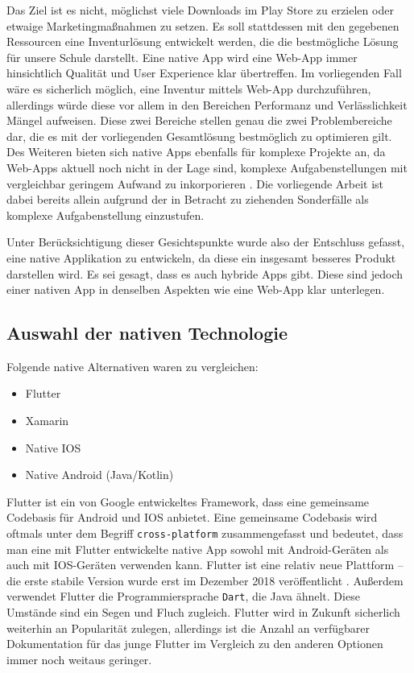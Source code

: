 Das Ziel ist es nicht, möglichst viele Downloads im Play Store zu
erzielen oder etwaige Marketingmaßnahmen zu setzen. Es soll stattdessen
mit den gegebenen Ressourcen eine Inventurlösung entwickelt werden, die
die bestmögliche Lösung für unsere Schule darstellt. Eine native App
wird eine Web-App immer hinsichtlich Qualität und User Experience klar
übertreffen. Im vorliegenden Fall wäre es sicherlich möglich, eine
Inventur mittels Web-App durchzuführen, allerdings würde diese vor allem
in den Bereichen Performanz und Verlässlichkeit Mängel aufweisen. Diese
zwei Bereiche stellen genau die zwei Problembereiche dar, die es mit der
vorliegenden Gesamtlösung bestmöglich zu optimieren gilt. Des Weiteren
bieten sich native Apps ebenfalls für komplexe Projekte an, da Web-Apps
aktuell noch nicht in der Lage sind, komplexe Aufgabenstellungen mit
vergleichbar geringem Aufwand zu inkorporieren \cite{complex-article}.
Die vorliegende Arbeit ist dabei bereits allein aufgrund der in Betracht
zu ziehenden Sonderfälle als komplexe Aufgabenstellung einzustufen.

Unter Berücksichtigung dieser Gesichtspunkte wurde also der Entschluss
gefasst, eine native Applikation zu entwickeln, da diese ein insgesamt
besseres Produkt darstellen wird. Es sei gesagt, dass es auch hybride
Apps gibt. Diese sind jedoch einer nativen App in denselben Aspekten wie
eine Web-App klar unterlegen.

\hypertarget{auswahl-der-nativen-technologie}{%
\subsection{Auswahl der nativen
Technologie}\label{auswahl-der-nativen-technologie}}

Folgende native Alternativen waren zu vergleichen:

\begin{itemize}
\tightlist
\item
  Flutter \cite{flutter}
\item
  Xamarin \cite{xamarin}
\item
  Native IOS
\item
  Native Android (Java/Kotlin)
\end{itemize}

Flutter ist ein von Google entwickeltes Framework, dass eine gemeinsame
Codebasis für Android und IOS anbietet. Eine gemeinsame Codebasis wird
oftmals unter dem Begriff \texttt{cross-platform} zusammengefasst und
bedeutet, dass man eine mit Flutter entwickelte native App sowohl mit
Android-Geräten als auch mit IOS-Geräten verwenden kann. Flutter ist
eine relativ neue Plattform -- die erste stabile Version wurde erst im
Dezember 2018 veröffentlicht \cite{flutter-stable}. Außerdem verwendet
Flutter die Programmiersprache \texttt{Dart}, die Java ähnelt. Diese
Umstände sind ein Segen und Fluch zugleich. Flutter wird in Zukunft
sicherlich weiterhin an Popularität zulegen, allerdings ist die Anzahl
an verfügbarer Dokumentation für das junge Flutter im Vergleich zu den
anderen Optionen immer noch weitaus geringer.

